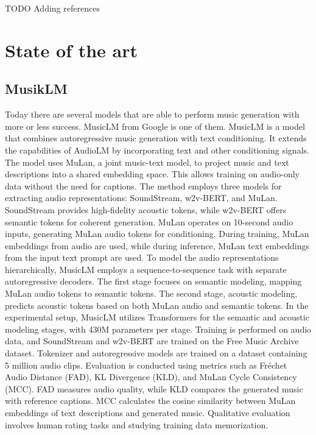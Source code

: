 TODO Adding references


\chapter{State of the art}
\label{chap:state_of_the_art}

\section{MusikLM}
\label{sec:MusikLM}

Today there are several models that are able to perform music generation with more or less success. MusicLM from Google is one of them. MusicLM is a model that combines autoregressive music generation with text conditioning. It extends the capabilities of AudioLM by incorporating text and other conditioning signals. The model uses MuLan, a joint music-text model, to project music and text descriptions into a shared embedding space. This allows training on audio-only data without the need for captions.
The method employs three models for extracting audio representations: SoundStream, w2v-BERT, and MuLan. SoundStream provides high-fidelity acoustic tokens, while w2v-BERT offers semantic tokens for coherent generation. MuLan operates on 10-second audio inputs, generating MuLan audio tokens for conditioning. During training, MuLan embeddings from audio are used, while during inference, MuLan text embeddings from the input text prompt are used.
To model the audio representations hierarchically, MusicLM employs a sequence-to-sequence task with separate autoregressive decoders. The first stage focuses on semantic modeling, mapping MuLan audio tokens to semantic tokens. The second stage, acoustic modeling, predicts acoustic tokens based on both MuLan audio and semantic tokens.
In the experimental setup, MusicLM utilizes Transformers for the semantic and acoustic modeling stages, with 430M parameters per stage. Training is performed on audio data, and SoundStream and w2v-BERT are trained on the Free Music Archive dataset. Tokenizer and autoregressive models are trained on a dataset containing 5 million audio clips.
Evaluation is conducted using metrics such as Fréchet Audio Distance (FAD), KL Divergence (KLD), and MuLan Cycle Consistency (MCC). FAD measures audio quality, while KLD compares the generated music with reference captions. MCC calculates the cosine similarity between MuLan embeddings of text descriptions and generated music. Qualitative evaluation involves human rating tasks and studying training data memorization.
